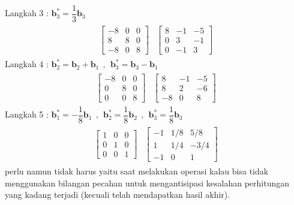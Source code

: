Langkah 3 : $\textbf{b}^*_3= \dfrac{1}{3}\textbf{b}_3$ \\
\begin{align*}
	\begin{array}{r|r} 
		\left[
		\begin{array}{rrr} 
			-8 & 0 & 0\\
			8 & 8 & 0\\
			-8 &0 & 8 
		\end{array} 
		\right]  & \left[
		\begin{array}{rrr} 
			8 & -1 & -5\\
			0 & 3 & -1\\
			0 &-1 & 3 
		\end{array} 
		\right]
	\end{array}
\end{align*}
Langkah 4 : $\textbf{b}^*_2= \textbf{b}_2 + \textbf{b}_1~~,~~\textbf{b}^*_3= \textbf{b}_3 - \textbf{b}_1$ \\
\begin{align*}
	\begin{array}{r|r} 
		\left[
		\begin{array}{rrr} 
			-8 & 0 & 0\\
			0 & 8 & 0\\
			0 &0 & 8 
		\end{array} 
		\right]  & \left[
		\begin{array}{rrr} 
			8 & -1 & -5\\
			8 & 2 & -6\\
			-8 &0 & 8 
		\end{array} 
		\right]
	\end{array}
\end{align*}
Langkah 5 : $\textbf{b}^*_1= -\dfrac{1}{8}\textbf{b}_1~~,~~\textbf{b}^*_2= \dfrac{1}{8}\textbf{b}_2~~,~~\textbf{b}^*_3= \dfrac{1}{8}\textbf{b}_3$ \\
\begin{align*}
	\begin{array}{r|r} 
		\left[
		\begin{array}{rrr} 
			1 & 0 & 0\\
			0 & 1 & 0\\
			0 &0 & 1 
		\end{array} 
		\right]  & \left[
		\begin{array}{rrr} 
			-1 & 1/8 & 5/8\\
			1 & 1/4 & -3/4\\
			-1 &0 & 1 
		\end{array} 
		\right]
	\end{array}
\end{align*}
perlu namun tidak harus yaitu saat melakukan operasi kalau bisa tidak menggunakan bilangan pecahan untuk mengantisipasi kesalahan perhitungan yang kadang terjadi (kecuali telah mendapatkan hasil akhir).